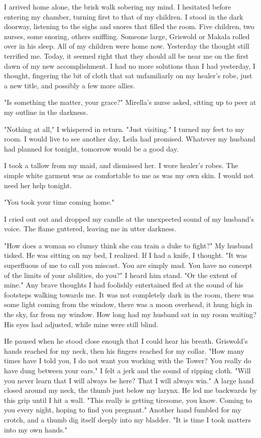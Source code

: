 \documentclass{article}
\begin{document}
I arrived home alone, the brisk walk sobering my mind. I hesitated before entering my chamber, turning first to that of my children. I stood in the dark doorway, listening to the sighs and snores that filled the room. Five children, two nurses, some snoring, others sniffling. Someone large, Griswold or Makala rolled over in his sleep. All of my children were home now. Yesterday the thought still terrified me.  Today, it seemed right that they should all be near me on the first dawn of my new accomplishment. I had no more solutions than I had yesterday, I thought, fingering the bit of cloth that sat unfamiliarly on my healer's robe, just a new title, and possibly a few more allies. 

"Is something the matter, your grace?" Mirella's nurse asked, sitting up to peer at my outline in the darkness.

"Nothing at all," I whispered in return. "Just visiting." I turned my feet to my room. I would live to see another day, Leila had promised. Whatever my husband had planned for tonight, tomorrow would be a good day. 

I took a tallow from my maid, and dismissed her. I wore healer's robes. The simple white garment was as comfortable to me as was my own skin. I would not need her help tonight.

"You took your time coming home."

I cried out out and dropped my candle at the unexpected sound of my husband's voice. The flame guttered, leaving me in utter darkness. 

"How does a woman so clumsy think she can train a duke to fight?" My husband tisked. He was sitting on my bed, I realized. If I had a knife, I thought. "It was superfluous of me to call you miscast. You are simply mad. You have no concept of the limits of your abilities, do you?" I heard him stand. "Or the extent of mine." Any brave thoughts I had foolishly entertained fled at the sound of his footsteps walking towards me. It was not completely dark in the room, there was some light coming from the window, there was a moon overhead, it hung high in the sky, far from my window. How long had my husband sat in my room waiting? His eyes had adjusted, while mine were still blind. 

He paused when he  stood close enough that I could hear his breath. Griswold's hands reached for my neck, then his fingers reached for my collar. "How many times have I told you, I do not want you working with the Tower? You really do have dung between your ears." I felt a jerk and the sound of ripping cloth. "Will you never learn that I will always be here? That I will always win." A large hand closed around my neck, the thumb just below my larynx. He led me backwards by this grip until I hit a wall. "This really is getting tiresome, you know. Coming to you every night, hoping to find you pregnant." Another hand fumbled for my crotch, and a thumb dig itself deeply into my bladder. "It is time I took matters into my own hands."
\end{document}
